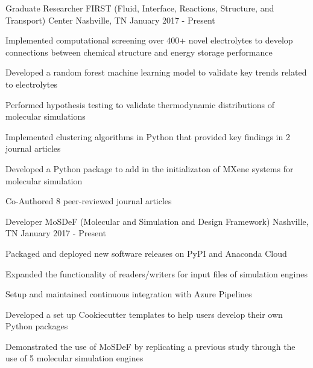 
\begin{cventries}
  \cventry
    {Graduate Researcher} %
    {FIRST (Fluid, Interface, Reactions, Structure, and Transport) Center} %
    {Nashville, TN} %
    {January 2017 - Present} %
    {
      \begin{cvitems} %
        \item{Implemented computational screening over 400+ novel electrolytes to
        develop \newline
        connections between chemical structure and energy storage performance}
        \item {Developed a random forest machine learning model to validate key trends related to
            electrolytes}
        \item{Performed hypothesis testing to validate thermodynamic
            distributions of molecular simulations}
        \item {Implemented clustering algorithms in Python that
            provided key findings in 2 journal articles}
        \item {Developed a Python package to add in the initializaton of 
            MXene systems for molecular simulation}
        \item {Co-Authored 8 peer-reviewed journal articles}
      \end{cvitems}
    }

  \cventry
    {Developer} %
    {MoSDeF (Molecular and Simulation and Design Framework)} %
    {Nashville, TN} %
    {January 2017 - Present} %
    {
      \begin{cvitems} %
      \item {Packaged and deployed new software releases on PyPI and Anaconda
          Cloud}
        \item {Expanded the functionality of readers/writers for input files of
            simulation engines}
        \item{Setup and maintained continuous integration with Azure Pipelines}
        \item{Developed a set up Cookiecutter templates to help users develop
            their own Python packages}
        \item{Demonstrated the use of MoSDeF by replicating a previous study
            through the use of 5 molecular simulation engines}
      \end{cvitems}
    }
\end{cventries}
